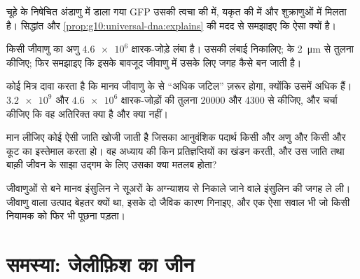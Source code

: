 \begin{exercise}[$\star\star$]\label{exo:g10:universal-dna:11}
चूहे के निषेचित अंडाणु में डाला गया GFP  उसकी त्वचा की  में,
यकृत की  में और शुक्राणुओं में मिलता है।  सिद्धांत और
\cref{prop:g10:universal-dna:explains} की मदद से समझाइए कि ऐसा क्यों है।
\end{exercise}

\begin{exercise}[$\star\star\star$]\label{exo:g10:universal-dna:12}
किसी जीवाणु का  अणु $\num{4.6e6}$ क्षारक-जोड़े लंबा है। उसकी लंबाई
निकालिए;  के \qty{2}{\micro m} से तुलना कीजिए; फिर समझाइए कि इसके
बावजूद जीवाणु में उसके लिए जगह कैसे बन जाती है।
\end{exercise}

\begin{exercise}[$\star\star\star$]\label{exo:g10:universal-dna:13}
कोई मित्र दावा करता है कि मानव  जीवाणु के  से ``अधिक जटिल'' ज़रूर
होगा, क्योंकि उसमें अधिक  हैं। $\num{3.2e9}$ और $\num{4.6e6}$
क्षारक-जोड़ों की तुलना $\num{20000}$ और 4300  से कीजिए, और चर्चा
कीजिए कि वह अतिरिक्त  क्या है और क्या नहीं।
\end{exercise}

\begin{exercise}[$\star\star\star$]\label{exo:g10:universal-dna:14}
मान लीजिए कोई ऐसी जाति खोजी जाती है जिसका आनुवंशिक पदार्थ किसी और अणु और
किसी और कूट का इस्तेमाल करता हो। वह अध्याय की किन प्रतिज्ञप्तियों का
खंडन करती, और उस जाति तथा बाक़ी जीवन के साझा उद्गम के लिए उसका क्या
मतलब होता?
\end{exercise}

\begin{exercise}[$\star\star\star$]\label{exo:g10:universal-dna:15}
जीवाणुओं से बने मानव इंसुलिन ने सूअरों के अग्न्याशय से निकाले जाने वाले
इंसुलिन की जगह ले ली। जीवाणु वाला उत्पाद बेहतर क्यों था, इसके दो जैविक
कारण गिनाइए, और एक ऐसा सवाल भी जो किसी नियामक को फिर भी पूछना पड़ता।
\end{exercise}

\section{समस्या: जेलीफ़िश का जीन}

